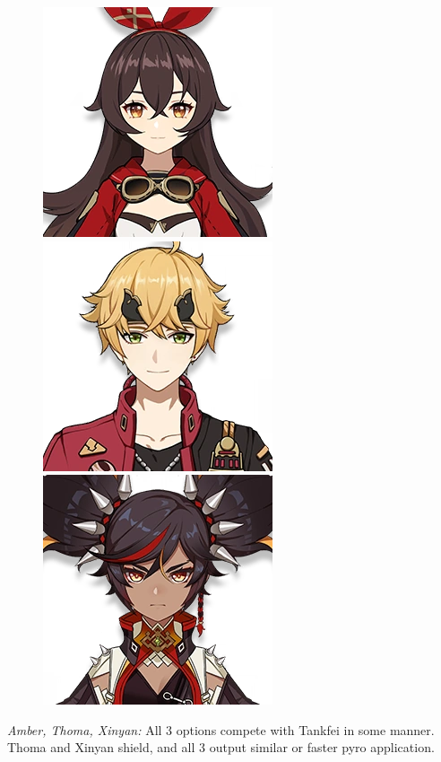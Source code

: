 \documentclass[11pt]{article}
\begin{document}
\begin{figure}[h]
    \centering
    \includegraphics[scale = 0.25]{Character_Amber.png}
    \includegraphics[scale = 0.25]{Character_Thoma.png}
    \includegraphics[scale = 0.25]{Character_Xinyan.png}
\end{figure}

\textit{Amber, Thoma, Xinyan:} All 3 options compete with Tankfei in some manner. Thoma and Xinyan shield, and all 3 output similar or faster pyro application. 
\end{document}
